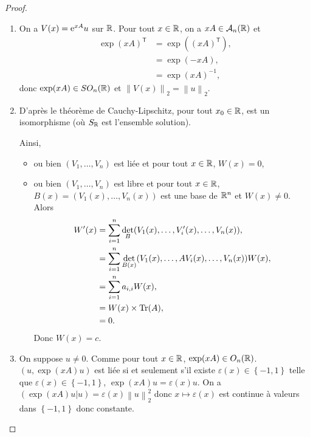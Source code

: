 \documentclass[12pt]{article}
\begin{document}
\begin{proof}
	\phantom{}
	\begin{enumerate}
		\item On a $V(x)=\mathrm{e}^{xA}u$ sur $\mathbb{R}$. Pour tout $x\in\mathbb{R}$, on a $xA\in\mathcal{A}_n(\mathbb{R})$ et 
		\begin{align}
			\exp(xA)^{\mathsf{T}}
			&=\exp((xA)^{\mathsf{T}}),\\
			&=\exp(-xA),\\
			&=\exp(xA)^{-1},
		\end{align}
		donc $\exp(xA)\in SO_n(\mathbb{R})$ et $\left\lVert V(x)\right\rVert_{2}=\left\lVert u\right\rVert_{2}$.

		\item D'après le théorème de Cauchy-Lipschitz, pour tout $x_0\in\mathbb{R}$,  est un isomorphisme (où $S_{\mathbb{R}}$ est l'ensemble solution).
		
		Ainsi,
		\begin{itemize}
			\item ou bien $(V_1,\dots,V_n)$ est liée et pour tout $x\in\mathbb{R}$, $W(x)=0$,
			\item ou bien $(V_1,\dots,V_n)$ est libre et pour tout $x\in\mathbb{R}$, $B(x)=(V_1(x),\dots,V_n(x))$ est une base de $\mathbb{R}^{n}$ et $W(x)\neq0$. Alors 
			\begin{align}
				W'(x)
				&=\sum_{i=1}^{n}\det_{B}(V_1(x),\dots,V_i'(x),\dots,V_n(x)),\\
				&=\sum_{i=1}^{n}\det_{B(x)}(V_1(x),\dots,AV_i(x),\dots,V_n(x))W(x),\\
				&=\sum_{i=1}^{n}a_{i,i}W(x),\\
				&=W(x)\times\operatorname{Tr}(A),\\
				&=0.
			\end{align}
			Donc $W(x)=c$.
		\end{itemize}

		\item On suppose $u\neq0$. Comme pour tout $x\in\mathbb{R}$, $\exp(xA)\in O_n(\mathbb{R})$. $(u,\exp(xA)u)$ est liée si et seulement s'il existe $\varepsilon(x)\in\left\lbrace-1,1\right\rbrace$ telle que $\varepsilon(x)\in\left\lbrace-1,1\right\rbrace$, $\exp(xA)u=\varepsilon(x)u$. On a $(\exp(xA)u|u)=\varepsilon(x)\left\lVert u\right\rVert_{2}^{2}$ donc $x\mapsto\varepsilon(x)$ est continue à valeurs dans $\left\lbrace-1,1\right\rbrace$ donc constante.
		

\end{enumerate}
\end{proof}
\end{document}
